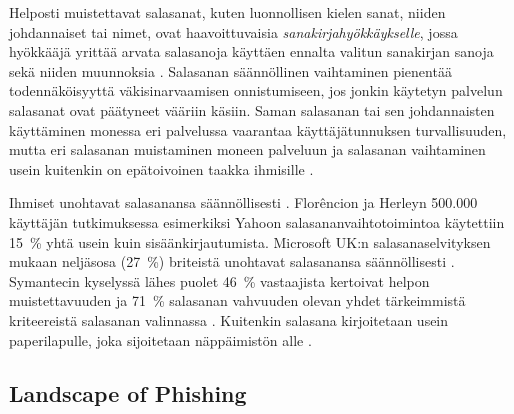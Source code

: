 \documentclass[english,gradu]{tktltiki}
\begin{document}
             Helposti muistettavat salasanat, kuten luonnollisen kielen sanat, niiden johdannaiset tai nimet, ovat haavoittuvaisia \emph{sanakirjahyökkäykselle}, jossa hyökkääjä yrittää arvata salasanoja käyttäen ennalta valitun sanakirjan sanoja sekä niiden muunnoksia \cite{users_are_not_the_enemy_99, passpet_06}. Salasanan säännöllinen vaihtaminen pienentää todennäköisyyttä väkisinarvaamisen onnistumiseen, jos jonkin käytetyn palvelun salasanat ovat päätyneet vääriin käsiin. Saman salasanan tai sen johdannaisten käyttäminen monessa eri palvelussa vaarantaa käyttäjätunnuksen turvallisuuden, mutta eri salasanan muistaminen moneen palveluun ja salasanan vaihtaminen usein kuitenkin on epätoivoinen taakka ihmisille \cite{password_management_strategies_06, passpet_06, pw_auth_system_perspective_08, users_are_not_the_enemy_99}.

             Ihmiset unohtavat salasanansa säännöllisesti \cite{ponemon_pw_survey_06, password_management_strategies_06}. Florêncion ja Herleyn 500.000 käyttäjän tutkimuksessa \cite{study_of_passwords_07} esimerkiksi Yahoon salasananvaihtotoimintoa käytettiin 15~\% yhtä usein kuin sisäänkirjautumista. Microsoft UK:n salasanaselvityksen mukaan neljäsosa (27~\%) briteistä unohtavat salasanansa säännöllisesti \cite{microsoft_pw_survey_04}. Symantecin kyselyssä lähes puolet 46~\% vastaajista kertoivat helpon muistettavuuden ja 71~\% salasanan vahvuuden olevan yhdet tärkeimmistä kriteereistä salasanan valinnassa \cite{symantec_pw_survey_10}. Kuitenkin salasana kirjoitetaan usein paperilapulle, joka sijoitetaan näppäimistön alle \cite{pw_auth_system_perspective_08}.




\subsection{Landscape of Phishing} %
\label{sub:landscape_of_phishing}
\end{document}
